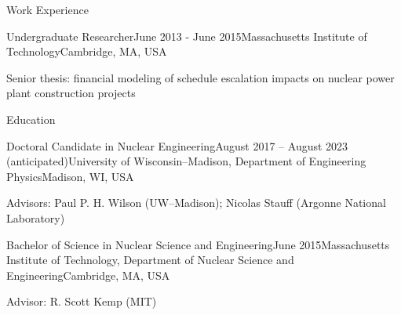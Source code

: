 \documentclass{resume} %
\begin{document}
\begin{rSection}{Work Experience}

\begin{rSubsection}{Undergraduate Researcher}{June 2013 - June 2015}{Massachusetts Institute of Technology}{Cambridge, MA, USA}
  \setlength{\itemsep}{-3pt}
  \item Senior thesis: financial modeling of schedule escalation impacts on nuclear power plant construction projects
\end{rSubsection}

\end{rSection}



\begin{rSection}{Education}

\begin{rSubsection}{Doctoral Candidate in Nuclear Engineering}{August 2017 -- August 2023 (anticipated)}{University of Wisconsin--Madison, Department of Engineering Physics}{Madison, WI, USA}
  \item Advisors: Paul P. H. Wilson (UW--Madison); Nicolas Stauff (Argonne National Laboratory)
\end{rSubsection}

\begin{rSubsection}{Bachelor of Science in Nuclear Science and Engineering}{June 2015}{Massachusetts Institute of Technology, Department of Nuclear Science and Engineering}{Cambridge, MA, USA}
  \item Advisor: R. Scott Kemp (MIT)
\end{rSubsection}

\end{rSection}
\end{document}
